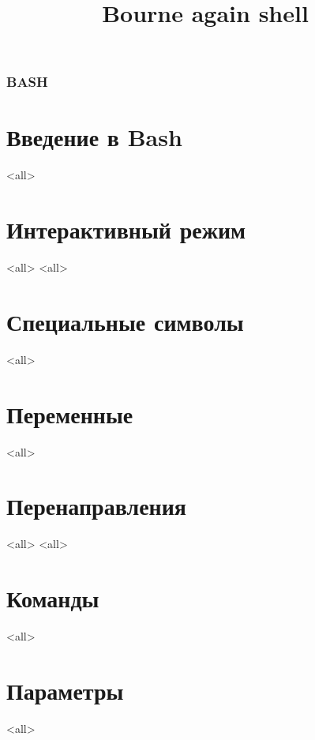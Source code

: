 
\title[bash]{Bourne again shell}




\begin{frame}
	\frametitle{BASH}
	\titlepage
	\vspace{-0.5cm}
	\begin{center}
	\end{center}
\end{frame}

\begin{frame}
	\tableofcontents
	[hideallsubsections]
\end{frame}



\section[Bash intro]{Введение в Bash}
\mode<all>{}

\section[Interactive]{Интерактивный режим}
\mode<all>{}
\mode<all>{}
\section[symbols]{Специальные символы}
\mode<all>{}
\section[variables]{Переменные}
\mode<all>{}
\section[redirection]{Перенаправления}
\mode<all>{}
\mode<all>{}
\section[Commands]{Команды}
\mode<all>{}
\section[Params]{Параметры}
\mode<all>{}


